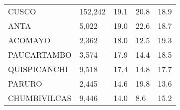\begin{tabular}{lllll}
	\cellcolor[HTML]{FF5050}CUSCO                                  & 152,242                                                               & 19.1                                                                             & 20.8                                                                        & 18.9                                                                                \\
	\cellcolor[HTML]{FF5050}ANTA                                   & 5,022                                                                 & 19.0                                                                             & 22.6                                                                        & 18.7                                                                                \\
	\cellcolor[HTML]{FF5050}ACOMAYO                                & 2,362                                                                 & 18.0                                                                             & 12.5                                                                        & 19.3                                                                                \\
	\cellcolor[HTML]{FF5050}PAUCARTAMBO                            & 3,574                                                                 & 17.9                                                                             & 14.4                                                                        & 18.5                                                                                \\
	\cellcolor[HTML]{FF5050}QUISPICANCHI                           & 9,518                                                                 & 17.4                                                                             & 14.8                                                                        & 17.7                                                                                \\
	\cellcolor[HTML]{FF5050}PARURO                                 & 2,445                                                                 & 14.6                                                                             & 19.8                                                                        & 13.6                                                                                \\
	\cellcolor[HTML]{FF5050}CHUMBIVILCAS                           & 9,446                                                                 & 14.0                                                                             & 8.6                                                                         & 15.2                                                                                \\

\end{tabular}
